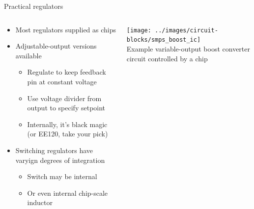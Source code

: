 \documentclass{beamer}
\begin{document}
\begin{frame}{Practical regulators}
  \begin{columns}[T]
    \begin{column}{.6\textwidth}
      \begin{itemize}
        \item Most regulators supplied as chips
        \item Adjustable-output versions available
        \begin{itemize}
          \item Regulate to keep feedback pin at constant voltage
          \item Use voltage divider from output to specify setpoint
          \item Internally, it's black magic (or EE120, take your pick)
        \end{itemize}
        \item Switching regulators have varyign degrees of integration
        \begin{itemize}
          \item Switch may be internal
          \item Or even internal chip-scale inductor
        \end{itemize}
      \end{itemize}
    \end{column}

    \begin{column}{0.4\textwidth} \centering
      \texttt{[image: ../images/circuit-blocks/smps\_boost\_ic]} \\
      Example variable-output boost converter circuit controlled by a chip
    \end{column}
  \end{columns}
\end{frame}
\end{document}
